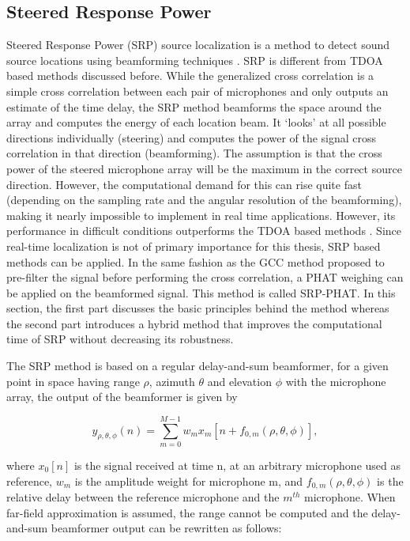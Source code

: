 \subsection{Steered Response Power}

Steered Response Power (SRP) source localization is a method to detect sound source locations using beamforming techniques \cite{krim1996two}. SRP is different from TDOA based methods discussed before. While the generalized cross correlation is a simple cross correlation between each pair of microphones and only outputs an estimate of the time delay, the SRP method beamforms the space around the array and computes the energy of each location beam.  It `looks' at all possible directions individually (steering) and computes the power of the signal cross correlation in that direction (beamforming). The assumption is that the cross power of the steered microphone array will be the maximum in the correct source direction. However, the computational demand for this can rise quite fast (depending on the sampling rate and the angular resolution of the beamforming), making it nearly impossible to implement in real time applications. However, its performance in difficult conditions outperforms the TDOA based methods \cite{dmochowski2007generalized}. Since real-time localization is not of primary importance for this thesis, SRP based methods can be applied. In the same fashion as the GCC method proposed to pre-filter the signal before performing the cross correlation, a PHAT weighing can be applied on the beamformed signal. This method is called SRP-PHAT. In this section, the first part discusses the basic principles behind the method whereas the second part introduces a hybrid method that improves the computational time of SRP without decreasing its robustness. 


The SRP method is based on a regular delay-and-sum beamformer, for a given point in space having range $\rho$, azimuth $\theta$ and elevation $\phi$ with the microphone array, the output of the beamformer is given by

\begin{equation}
    y_{\rho,\theta,\phi}(n)=\sum\limits_{m=0}^{M-1}{w_m x_m[n + f_{0,m}(\rho,\theta,\phi)]},
\end{equation}

where $x_0[n]$ is the signal received at time n, at an arbitrary microphone used as reference, $w_m$ is the amplitude weight for microphone m, and $f_{0,m}(\rho,\theta,\phi)$ is the relative delay between the reference microphone and the $m^{th}$ microphone. When far-field approximation is assumed, the range cannot be computed and the delay-and-sum beamformer output can be rewritten as follows:

